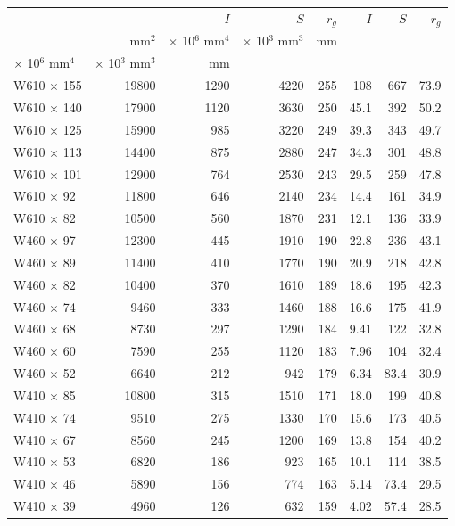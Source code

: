 \documentclass[a4paper,openany,nobib]{tufte-book}
\begin{document}
{{\begin{center}
\begin{tabular}{lrrrrrrr}
\toprule
 &  & \(I\) & \(S\) & \(r_g\) & \(I\) & \(S\) & \(r_g\)\\
 & mm\(^2\) & \(\times\) 10\(^6\) mm\(^4\) & \(\times\) 10\(^3\) mm\(^3\) & mm &  &  & \\
\(\times\) 10\(^6\) mm\(^4\) & \(\times\) 10\(^3\) mm\(^3\) & mm &  &  &  &  & \\
\midrule
W610 \(\times\) 155 & 19800 & 1290 & 4220 & 255 & 108 & 667 & 73.9\\
W610 \(\times\) 140 & 17900 & 1120 & 3630 & 250 & 45.1 & 392 & 50.2\\
W610 \(\times\) 125 & 15900 & 985 & 3220 & 249 & 39.3 & 343 & 49.7\\
W610 \(\times\) 113 & 14400 & 875 & 2880 & 247 & 34.3 & 301 & 48.8\\
W610 \(\times\) 101 & 12900 & 764 & 2530 & 243 & 29.5 & 259 & 47.8\\
W610 \(\times\) 92 & 11800 & 646 & 2140 & 234 & 14.4 & 161 & 34.9\\
W610 \(\times\) 82 & 10500 & 560 & 1870 & 231 & 12.1 & 136 & 33.9\\
W460 \(\times\) 97 & 12300 & 445 & 1910 & 190 & 22.8 & 236 & 43.1\\
W460 \(\times\) 89 & 11400 & 410 & 1770 & 190 & 20.9 & 218 & 42.8\\
W460 \(\times\) 82 & 10400 & 370 & 1610 & 189 & 18.6 & 195 & 42.3\\
W460 \(\times\) 74 & 9460 & 333 & 1460 & 188 & 16.6 & 175 & 41.9\\
W460 \(\times\) 68 & 8730 & 297 & 1290 & 184 & 9.41 & 122 & 32.8\\
W460 \(\times\) 60 & 7590 & 255 & 1120 & 183 & 7.96 & 104 & 32.4\\
W460 \(\times\) 52 & 6640 & 212 & 942 & 179 & 6.34 & 83.4 & 30.9\\
W410 \(\times\) 85 & 10800 & 315 & 1510 & 171 & 18.0 & 199 & 40.8\\
W410 \(\times\) 74 & 9510 & 275 & 1330 & 170 & 15.6 & 173 & 40.5\\
W410 \(\times\) 67 & 8560 & 245 & 1200 & 169 & 13.8 & 154 & 40.2\\
W410 \(\times\) 53 & 6820 & 186 & 923 & 165 & 10.1 & 114 & 38.5\\
W410 \(\times\) 46 & 5890 & 156 & 774 & 163 & 5.14 & 73.4 & 29.5\\
W410 \(\times\) 39 & 4960 & 126 & 632 & 159 & 4.02 & 57.4 & 28.5\\

\end{tabular}
\end{center}}}
\end{document}
